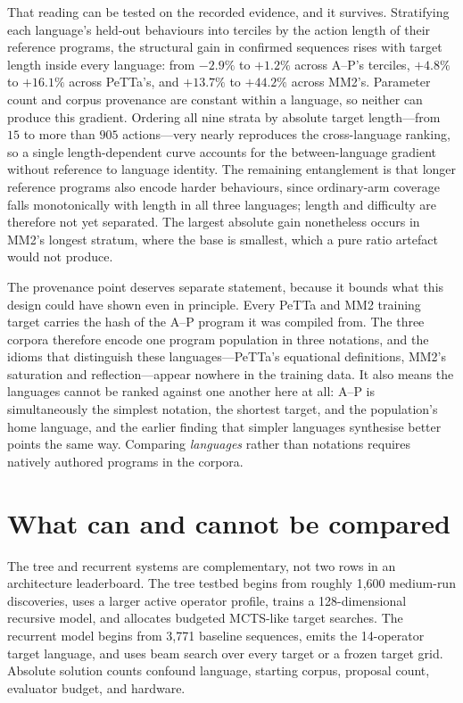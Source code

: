 \documentclass[11pt]{article}
\begin{document}
That reading can be tested on the recorded evidence, and it survives.  Stratifying each
language's held-out behaviours into terciles by the action length of their reference
programs, the structural gain in confirmed sequences rises with target length inside every
language: from $-2.9\%$ to $+1.2\%$ across A--P's terciles, $+4.8\%$ to $+16.1\%$ across
PeTTa's, and $+13.7\%$ to $+44.2\%$ across MM2's.  Parameter count and corpus provenance
are constant within a language, so neither can produce this gradient.  Ordering all nine
strata by absolute target length---from $15$ to more than $905$ actions---very nearly
reproduces the cross-language ranking, so a single length-dependent curve accounts for the
between-language gradient without reference to language identity.  The remaining
entanglement is that longer reference programs also encode harder behaviours, since
ordinary-arm coverage falls monotonically with length in all three languages; length and
difficulty are therefore not yet separated.  The largest absolute gain nonetheless occurs
in MM2's longest stratum, where the base is smallest, which a pure ratio artefact would
not produce.

The provenance point deserves separate statement, because it bounds what this design
could have shown even in principle.  Every PeTTa and MM2 training target carries the hash
of the A--P program it was compiled from.  The three corpora therefore encode one program
population in three notations, and the idioms that distinguish these languages---PeTTa's
equational definitions, MM2's saturation and reflection---appear nowhere in the training
data.  It also means the languages cannot be ranked against one another here at all: A--P
is simultaneously the simplest notation, the shortest target, and the population's home
language, and the earlier finding that simpler languages synthesise better points the
same way.  Comparing \emph{languages} rather than notations requires natively authored
programs in the corpora.

\section{What can and cannot be compared}

The tree and recurrent systems are complementary, not two rows in an architecture
leaderboard.  The tree testbed begins from roughly 1,600 medium-run discoveries, uses a
larger active operator profile, trains a 128-dimensional recursive model, and allocates
budgeted MCTS-like target searches.  The recurrent model begins from 3,771 baseline
sequences, emits the 14-operator target language, and uses beam search over every target or
a frozen target grid.  Absolute solution counts confound language, starting corpus,
proposal count, evaluator budget, and hardware.
\end{document}
